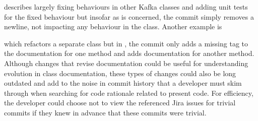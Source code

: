 \begin{center}
\end{center}

describes largely fixing behaviours in other Kafka classes and adding unit tests for the fixed behaviour but insofar as  is concerned, the commit simply removes a newline, not impacting any behaviour in the class. 
Another example is 

\begin{center}
\end{center}

which refactors a separate class but in , the commit only adds a missing  tag to the documentation for one method and adds documentation for another method.
Although changes that revise documentation could be useful for understanding evolution in class documentation, these types of changes could also be long outdated and add to the noise in commit history that a developer must skim through when searching for code rationale related to present code.
For efficiency, the developer could choose not to view the referenced Jira issues for trivial commits if they knew in advance that these commits were trivial.

